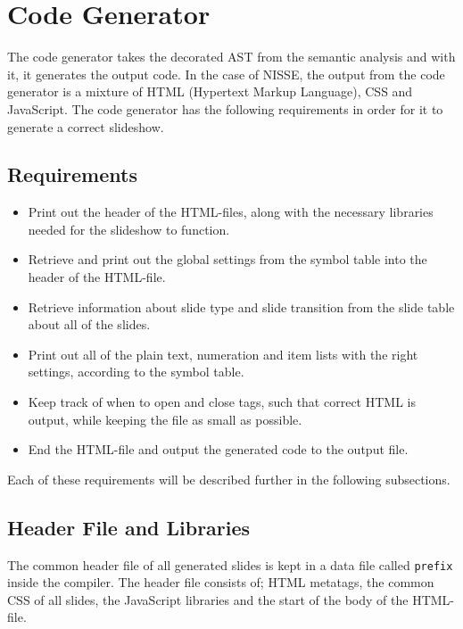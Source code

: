 \chapter{Code Generator}

The code generator takes the decorated AST from the semantic analysis and with it, it generates the output code. In the case of NISSE, the output from the code generator is a mixture of HTML (Hypertext Markup Language), CSS and JavaScript. The code generator has the following requirements in order for it to generate a correct slideshow.

\section{Requirements}
\begin{itemize}
  \item Print out the header of the HTML-files, along with the necessary libraries needed for the slideshow to function.
  \item Retrieve and print out the global settings from the symbol table into the header of the HTML-file.
  \item Retrieve information about slide type and slide transition from the slide table about all of the slides.
  \item Print out all of the plain text, numeration and item lists with the right settings, according to the symbol table.
  \item Keep track of when to open and close tags, such that correct HTML is output, while keeping the file as small as possible.
  \item End the HTML-file and output the generated code to the output file.
\end{itemize}
Each of these requirements will be described further in the following subsections.

\section{Header File and Libraries}
The common header file of all generated slides is kept in a data file called \texttt{prefix} inside the compiler. The header file consists of; HTML metatags, the common CSS of all slides, the JavaScript libraries and the start of the body of the HTML-file. \\

 \\

